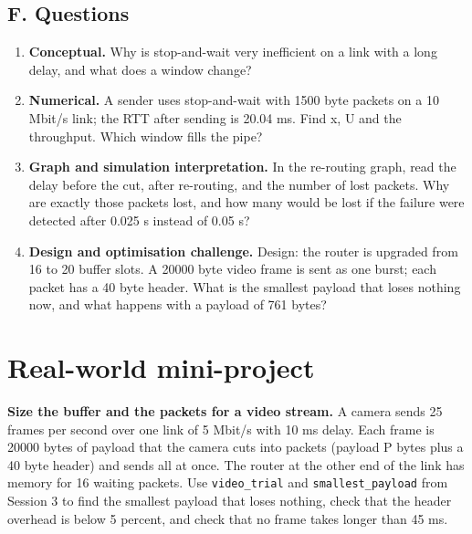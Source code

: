 \documentclass[11pt,a4paper]{article}
\begin{document}
\subsection*{F. Questions}
\begin{enumerate}[nosep]
\item \textbf{Conceptual.} Why is stop-and-wait very inefficient on a link with a long delay, and what does a window change?
\item \textbf{Numerical.} A sender uses stop-and-wait with 1500 byte packets on a 10 Mbit/s link; the RTT after sending is 20.04 ms. Find x, U and the throughput. Which window fills the pipe?
\item \textbf{Graph and simulation interpretation.} In the re-routing graph, read the delay before the cut, after re-routing, and the number of lost packets. Why are exactly those packets lost, and how many would be lost if the failure were detected after 0.025 s instead of 0.05 s?
\item \textbf{Design and optimisation challenge.} Design: the router is upgraded from 16 to 20 buffer slots. A 20000 byte video frame is sent as one burst; each packet has a 40 byte header. What is the smallest payload that loses nothing now, and what happens with a payload of 761 bytes?
\end{enumerate}

\section{Real-world mini-project}
\textbf{Size the buffer and the packets for a video stream.} A camera sends 25 frames per second over one link of 5 Mbit/s with 10 ms delay. Each frame is 20000 bytes of payload that the camera cuts into packets (payload P bytes plus a 40 byte header) and sends all at once. The router at the other end of the link has memory for 16 waiting packets. Use \texttt{video\_trial} and \texttt{smallest\_payload} from Session 3 to find the smallest payload that loses nothing, check that the header overhead is below 5 percent, and check that no frame takes longer than 45 ms.
\end{document}
